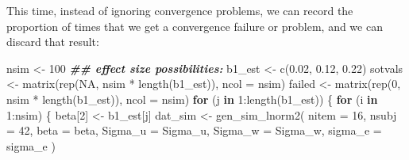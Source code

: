 \documentclass[
  12pt,
]{krantz}
\newenvironment{Shaded}{\begin{snugshade}}{\end{snugshade}}
\newcommand{\AttributeTok}[1]{\textcolor[rgb]{0.77,0.63,0.00}{#1}}
\newcommand{\ConstantTok}[1]{\textcolor[rgb]{0.00,0.00,0.00}{#1}}
\newcommand{\ControlFlowTok}[1]{\textcolor[rgb]{0.13,0.29,0.53}{\textbf{#1}}}
\newcommand{\DecValTok}[1]{\textcolor[rgb]{0.00,0.00,0.81}{#1}}
\newcommand{\DocumentationTok}[1]{\textcolor[rgb]{0.56,0.35,0.01}{\textbf{\textit{#1}}}}
\newcommand{\FloatTok}[1]{\textcolor[rgb]{0.00,0.00,0.81}{#1}}
\newcommand{\FunctionTok}[1]{\textcolor[rgb]{0.00,0.00,0.00}{#1}}
\newcommand{\NormalTok}[1]{#1}
\newcommand{\OtherTok}[1]{\textcolor[rgb]{0.56,0.35,0.01}{#1}}
\newcommand{\SpecialCharTok}[1]{\textcolor[rgb]{0.00,0.00,0.00}{#1}}
\theoremstyle{definition}
\theoremstyle{definition}
\theoremstyle{definition}
\theoremstyle{definition}
\theoremstyle{remark}
\begin{document}
This time, instead of ignoring convergence problems, we can record the proportion of times that we get a convergence failure or problem, and we can discard that result:

\begin{Shaded}
\begin{Highlighting}[]
\NormalTok{nsim }\OtherTok{\textless{}{-}} \DecValTok{100}
\DocumentationTok{\#\# effect size possibilities:}
\NormalTok{b1\_est }\OtherTok{\textless{}{-}} \FunctionTok{c}\NormalTok{(}\FloatTok{0.02}\NormalTok{, }\FloatTok{0.12}\NormalTok{, }\FloatTok{0.22}\NormalTok{)}
\NormalTok{sotvals }\OtherTok{\textless{}{-}} \FunctionTok{matrix}\NormalTok{(}\FunctionTok{rep}\NormalTok{(}\ConstantTok{NA}\NormalTok{, nsim }\SpecialCharTok{*} \FunctionTok{length}\NormalTok{(b1\_est)), }\AttributeTok{ncol =}\NormalTok{ nsim)}
\NormalTok{failed }\OtherTok{\textless{}{-}} \FunctionTok{matrix}\NormalTok{(}\FunctionTok{rep}\NormalTok{(}\DecValTok{0}\NormalTok{, nsim }\SpecialCharTok{*} \FunctionTok{length}\NormalTok{(b1\_est)), }\AttributeTok{ncol =}\NormalTok{ nsim)}
\ControlFlowTok{for}\NormalTok{ (j }\ControlFlowTok{in} \DecValTok{1}\SpecialCharTok{:}\FunctionTok{length}\NormalTok{(b1\_est)) \{}
  \ControlFlowTok{for}\NormalTok{ (i }\ControlFlowTok{in} \DecValTok{1}\SpecialCharTok{:}\NormalTok{nsim) \{}
\NormalTok{    beta[}\DecValTok{2}\NormalTok{] }\OtherTok{\textless{}{-}}\NormalTok{ b1\_est[j]}
\NormalTok{    dat\_sim }\OtherTok{\textless{}{-}} \FunctionTok{gen\_sim\_lnorm2}\NormalTok{(}
      \AttributeTok{nitem =} \DecValTok{16}\NormalTok{,}
      \AttributeTok{nsubj =} \DecValTok{42}\NormalTok{,}
      \AttributeTok{beta =}\NormalTok{ beta,}
      \AttributeTok{Sigma\_u =}\NormalTok{ Sigma\_u,}
      \AttributeTok{Sigma\_w =}\NormalTok{ Sigma\_w,}
      \AttributeTok{sigma\_e =}\NormalTok{ sigma\_e}
\NormalTok{    )}


\end{Highlighting}
\end{Shaded}
\end{document}
